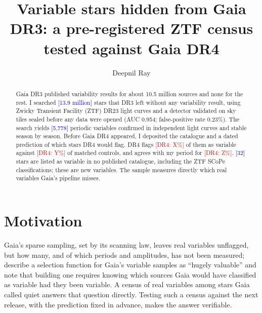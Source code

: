 \documentclass[RNAAS]{aastex701}
\newcommand{\dr}[1]{\textcolor{red}{[DR4: #1]}}
\newcommand{\fz}[1]{\textcolor{blue}{[#1]}}
\begin{document}
\title{Variable stars hidden from Gaia DR3: a pre-registered ZTF census tested against Gaia DR4}

\author[0000-0001-8779-0700]{Deepnil Ray}

\begin{abstract}
Gaia DR3 published variability results for about 10.5 million sources and none for the rest. I searched
\fz{13.9 million} stars that DR3 left without any variability result, using Zwicky Transient Facility (ZTF) DR23 light
curves and a detector validated on sky tiles sealed before any data were opened (AUC 0.954; false-positive rate
0.23\%). The search yields \fz{5,778} periodic variables confirmed in independent light curves and stable season by
season. Before Gaia DR4 appeared, I deposited the catalogue and a dated prediction of which stars DR4 would flag.
DR4 flags \dr{X\%} of them as variable against \dr{Y\%} of matched controls, and agrees with my period for
\dr{Z\%}. \fz{32} stars are listed as variable in no published catalogue, including the ZTF SCoPe classifications; these are new
variables. The sample measures directly which real variables Gaia's pipeline misses.
\end{abstract}


\section{Motivation}
Gaia's sparse sampling, set by its scanning law, leaves real variables unflagged, but how many, and of which
periods and amplitudes, has not been measured; \citet{Everall2022} describe a selection function for Gaia's
variable samples as ``hugely valuable'' and note that building one requires knowing which sources Gaia would have
classified as variable had they been variable. A census of real variables among stars Gaia called quiet answers
that question directly. Testing such a census against the next release, with the prediction fixed in advance,
makes the answer verifiable.
\end{document}

